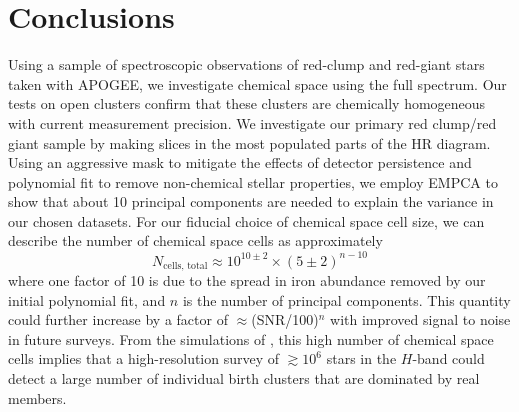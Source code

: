 \documentclass[a4paper,fleqn,usenatbib]{mnras}
\newcommand       \Ncells   {{N_{\mathrm{cells}}}}
\begin{document}

\section{Conclusions}
\label{sec:conclusion}
Using a sample of spectroscopic observations of red-clump and red-giant stars taken with APOGEE, we investigate chemical space using the full spectrum. Our tests on open clusters confirm that these clusters are chemically homogeneous with current measurement precision. We investigate our primary red clump/red giant sample by making slices in the most populated parts of the HR diagram. Using an aggressive mask to mitigate the effects of detector persistence and polynomial fit to remove non-chemical stellar properties, we employ EMPCA to show that about 10 principal components are needed to explain the variance in our chosen datasets. For our fiducial choice of chemical space cell size, we can describe the number of chemical space cells as approximately 
\begin{equation}
	N_{\mathrm{cells,\,total}} \approx 10^{10\pm2} \times (5\pm 2)^{n-10}
\end{equation}
where one factor of 10 is due to the spread in iron abundance removed by our initial polynomial fit, and $n$ is the number of principal components. This quantity could further increase by a factor of $\approx$(SNR/100)$^n$ with improved signal to noise in future surveys. From the simulations of \citet{Ting2015a}, this high number of chemical space cells implies that a high-resolution survey of $\gtrsim 10^6$ stars in the $H$-band could detect a large number of individual birth clusters that are dominated by real members.
\end{document}
